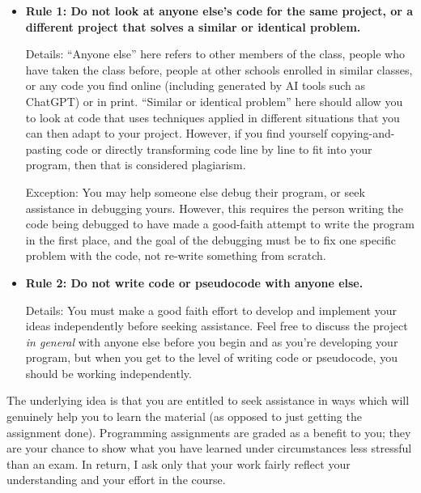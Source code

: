 \documentclass [letterpaper,11pt]{article}
\begin{document}
\begin{description}
\begin{itemize}
        \begin{itemize}
                \item \textbf{Rule 1: Do not look at anyone else's code for the same project, or a different project that solves a similar 
                or identical problem.}
                
                Details: ``Anyone else'' here refers to other members of the class, people who have taken the class before, people at other
                schools enrolled in similar classes, or any code you find online (including generated by AI tools such as ChatGPT) or in print.  ``Similar or identical problem'' here should 
                allow you to look at code that uses techniques applied in different situations that you can then 
                adapt to your project.  However, if you find yourself copying-and-pasting code or directly transforming
                code line by line to fit into your program, then that is considered plagiarism.
                
                                
                Exception: You may help someone else debug their program, or seek assistance in debugging yours.  However, 
                this requires the person writing the code being debugged to have made a good-faith attempt
                to write the program in the first place, and the goal of the debugging must be to fix
                one specific problem with the code, not re-write something from scratch.
                
                \item \textbf{Rule 2: Do not write code or pseudocode with anyone else.}
                
                Details: You must make a good faith effort to develop and implement your ideas
                independently before seeking assistance.  Feel free to discuss the project \emph{in general} with anyone else
                before you begin and as you're developing your program, but when you get to the level of writing code or
                pseudocode, you should be working independently.
                
                        \end{itemize}
        
        The underlying idea is that you are entitled to seek assistance in ways which will genuinely help you to learn the material (as opposed to just getting the assignment done).  Programming assignments are graded as a benefit to you;  they are your chance to show what you have learned under circumstances less stressful than an exam.  In return, I ask only that your work fairly reflect your understanding and your effort in the course.
        \end{itemize}




\end{description}
\end{document}
